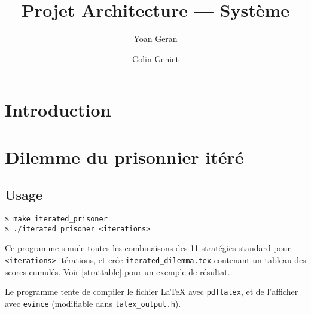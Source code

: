 \documentclass[10pt]{article}
\title{Projet Architecture --- Système}
\author{Yoan Geran \and Colin Geniet}
\begin{document}
\maketitle
\tableofcontents

\section*{Introduction}

\section{Dilemme du prisonnier itéré}
\subsection{Usage}
\begin{verbatim}
$ make iterated_prisoner
$ ./iterated_prisoner <iterations>
\end{verbatim}

Ce programme simule toutes les combinaisons des 11 stratégies standard pour \verb|<iterations>| itérations,
et crée \verb|iterated_dilemma.tex| contenant un tableau des scores cumulés.
Voir \ref{strattable} pour un exemple de résultat.

Le programme tente de compiler le fichier \LaTeX{} avec \verb|pdflatex|, et de l'afficher avec \verb|evince|
(modifiable dans \verb|latex_output.h|).
\end{document}
